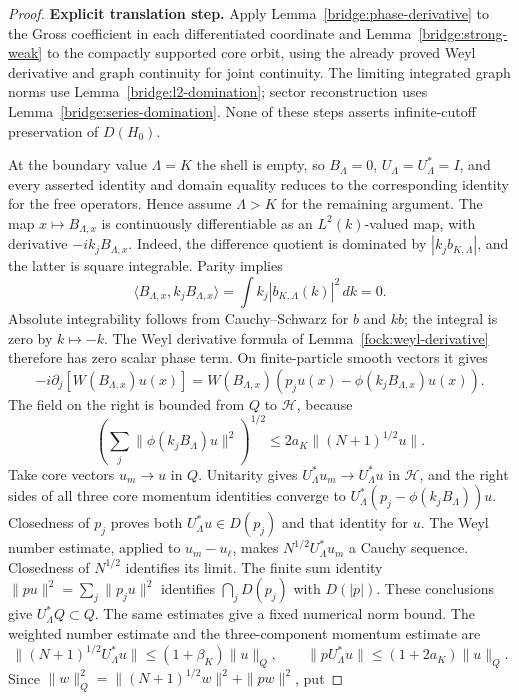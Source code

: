 \documentclass[11pt,a4paper]{article}
\theoremstyle{definition}
\theoremstyle{remark}
\begin{document}
\begin{proof}
\noindent\textbf{Explicit translation step.} Apply Lemma~\ref{bridge:phase-derivative} to the Gross coefficient in
each differentiated coordinate and Lemma~\ref{bridge:strong-weak} to the
compactly supported core orbit, using the already proved Weyl derivative
and graph continuity for joint continuity. The limiting integrated graph
norms use Lemma~\ref{bridge:l2-domination}; sector reconstruction uses
Lemma~\ref{bridge:series-domination}. None of these steps asserts
infinite-cutoff preservation of $D(H_0)$.

At the boundary value $\Lambda=K$ the shell is empty, so
$B_\Lambda=0$, $U_\Lambda=U_\Lambda^*=I$, and every asserted identity
and domain equality reduces to the corresponding identity for the
free operators. Hence assume $\Lambda>K$ for the remaining argument.
The map $x\mapsto B_{\Lambda,x}$ is continuously differentiable as an
$L^2(k)$-valued map, with derivative $-ik_jB_{\Lambda,x}$.
Indeed, the difference quotient is dominated by $|k_jb_{K,\Lambda}|$,
and the latter is square integrable. Parity implies
\[
 \langle B_{\Lambda,x},k_jB_{\Lambda,x}\rangle
       =\int k_j|b_{K,\Lambda}(k)|^2\,dk=0.
\]
Absolute integrability follows from Cauchy--Schwarz for $b$ and $kb$;
the integral is zero by $k\mapsto-k$. The Weyl derivative formula of
Lemma~\ref{fock:weyl-derivative} therefore has zero scalar phase term.
On finite-particle smooth vectors it gives
\[
 -i\partial_j[W(B_{\Lambda,x})u(x)]
 =W(B_{\Lambda,x})(p_ju(x)-\phi(k_jB_{\Lambda,x})u(x)).
\]
The field on the right is bounded from $Q$ to $\mathcal H$, because
\[
 \left(\sum_j\|\phi(k_jB_\Lambda)u\|^2\right)^{1/2}
 \leq2a_K\|(N+1)^{1/2}u\|.
\]
Take core vectors $u_m\to u$ in $Q$. Unitarity gives
$U_\Lambda^*u_m\to U_\Lambda^*u$ in $\mathcal H$, and the
right sides of all three core momentum identities converge to
$U_\Lambda^*(p_j-\phi(k_jB_\Lambda))u$.
Closedness of $p_j$ proves both $U_\Lambda^*u\in D(p_j)$ and
that identity for $u$. The Weyl number estimate, applied to
$u_m-u_\ell$, makes $N^{1/2}U_\Lambda^*u_m$ a Cauchy sequence.
Closedness of $N^{1/2}$ identifies its limit. The finite sum identity
$\|pu\|^2=\sum_j\|p_ju\|^2$ identifies
$\bigcap_jD(p_j)$ with $D(|p|)$. These conclusions give
$U_\Lambda^*Q\subset Q$. The same estimates give a fixed numerical
norm bound. The weighted number estimate and the three-component
momentum estimate are
\[
 \|(N+1)^{1/2}U_\Lambda^*u\|
       \leq(1+\beta_K)\|u\|_Q,\qquad
 \|pU_\Lambda^*u\|\leq(1+2a_K)\|u\|_Q.
\]
Since $\|w\|_Q^2=\|(N+1)^{1/2}w\|^2+\|pw\|^2$, put

\end{proof}
\end{document}
